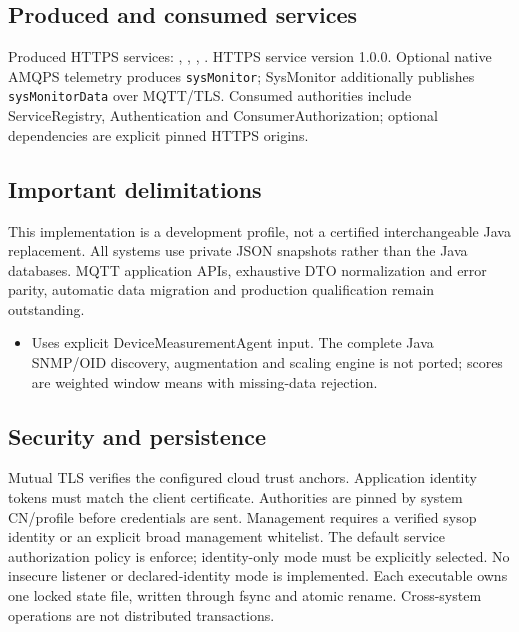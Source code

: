 \documentclass[a4paper]{arrowhead}
\begin{document}
\subsection{Produced and consumed services}
Produced HTTPS services: , \allowbreak {}, \allowbreak {}, \allowbreak {}.
HTTPS service version 1.0.0. Optional native AMQPS telemetry produces \texttt{sysMonitor}; SysMonitor additionally publishes \texttt{sysMonitorData} over MQTT/TLS. Consumed authorities include ServiceRegistry, Authentication and ConsumerAuthorization; optional dependencies are explicit pinned HTTPS origins.
\subsection{Important delimitations}
This implementation is a development profile, not a certified interchangeable Java replacement. All systems use private JSON snapshots rather than the Java databases. MQTT application APIs, exhaustive DTO normalization and error parity, automatic data migration and production qualification remain outstanding.
\begin{itemize}
\item Uses explicit DeviceMeasurementAgent input. The complete Java SNMP/OID discovery, augmentation and scaling engine is not ported; scores are weighted window means with missing-data rejection.
\end{itemize}
\subsection{Security and persistence}
Mutual TLS verifies the configured cloud trust anchors. Application identity tokens must match the client certificate. Authorities are pinned by system CN/profile before credentials are sent. Management requires a verified sysop identity or an explicit broad management whitelist. The default service authorization policy is enforce; identity-only mode must be explicitly selected. No insecure listener or declared-identity mode is implemented. Each executable owns one locked state file, written through fsync and atomic rename. Cross-system operations are not distributed transactions.
\clearpage
\end{document}
